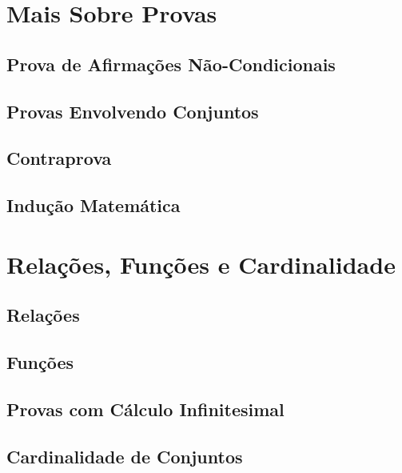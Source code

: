 \documentclass[a4paper,11pt,oneside]{book}
\theoremstyle{definition}
\theoremstyle{break}
\begin{document}
\part{Mais Sobre Provas}

\chapter{Prova de Afirmações Não-Condicionais}

\chapter{Provas Envolvendo Conjuntos}

\chapter{Contraprova}

\chapter{Indução Matemática}


\part{Relações, Funções e Cardinalidade}

\chapter{Relações}

\chapter{Funções}

\chapter{Provas com Cálculo Infinitesimal}

\chapter{Cardinalidade de Conjuntos}
\end{document}
